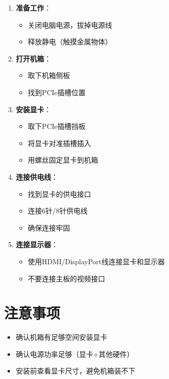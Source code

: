 \documentclass[12pt,UTF8]{ctexbook}
\begin{document}
\begin{enumerate}
    \item \textbf{准备工作}：
    \begin{itemize}[leftmargin=2em]
        \item 关闭电脑电源，拔掉电源线
        \item 释放静电（触摸金属物体）
    \end{itemize}
    
    \item \textbf{打开机箱}：
    \begin{itemize}[leftmargin=2em]
        \item 取下机箱侧板
        \item 找到PCIe插槽位置
    \end{itemize}
    
    \item \textbf{安装显卡}：
    \begin{itemize}[leftmargin=2em]
        \item 取下PCIe插槽挡板
        \item 将显卡对准插槽插入
        \item 用螺丝固定显卡到机箱
    \end{itemize}
    
    \item \textbf{连接供电线}：
    \begin{itemize}[leftmargin=2em]
        \item 找到显卡的供电接口
        \item 连接6针/8针供电线
        \item 确保连接牢固
    \end{itemize}
    
    \item \textbf{连接显示器}：
    \begin{itemize}[leftmargin=2em]
        \item 使用HDMI/DisplayPort线连接显卡和显示器
        \item 不要连接主板的视频接口
    \end{itemize}
\end{enumerate}

\section{注意事项}

\begin{itemize}[leftmargin=2em]
    \item 确认机箱有足够空间安装显卡
    \item 确认电源功率足够（显卡+其他硬件）
    \item 安装前查看显卡尺寸，避免机箱装不下
\end{itemize}
\end{document}

